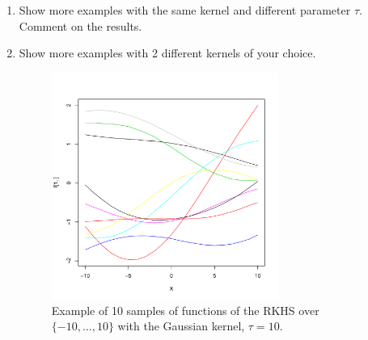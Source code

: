 \documentclass{article}[12pt]
\begin{document}
\begin{enumerate}
\begin{enumerate}
Note: you should obtain a figure similar to the figure \ref{fig:Gauss}. 
\item Show more examples with the same kernel and different parameter $\tau$. Comment on the results. 
\item Show more examples with 2 different kernels of your choice. 
\begin{figure}
	\centering 
\includegraphics[width=0.7\textwidth]{./Gauss.pdf}
\caption{\label{fig:Gauss}Example of 10 samples of functions of the RKHS over $\{-10,\ldots,10\}$ with the Gaussian kernel, $\tau=10$.}
\end{figure}
\end{enumerate}
\end{enumerate} 
\end{document}
